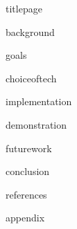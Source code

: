 \documentclass[12pt]{article}
\begin{document}
\doublespacing

{titlepage}

{background}

{goals}

{choiceoftech}

{implementation}

{demonstration}

{futurework}

{conclusion}

{references}

\singlespacing
{appendix}
\end{document}
